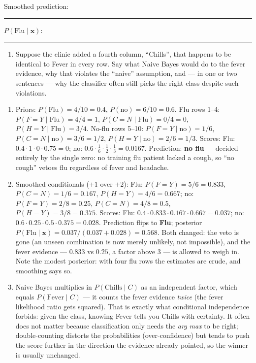 \documentclass[
  11pt,
]{article}
\providecommand{\tightlist}{%
  \setlength{\itemsep}{0pt}\setlength{\parskip}{0pt}}
\newcommand{\answerspace}[1]{\par\vspace*{#1}}  %
\newcommand{\blank}[1][1.2in]{\rule{#1}{0.4pt}}
\begin{document}
Smoothed prediction:
\blank[0.8in]\quad \(P(\text{Flu} \mid \mathbf{x})\): \blank[0.8in]

\answerspace{2.4in}

\begin{enumerate}
\def\labelenumi{(\alph{enumi})}
\setcounter{enumi}{2}
\tightlist
\item
  Suppose the clinic added a fourth column, ``Chills'', that happens to
  be identical to Fever in every row. Say what Naive Bayes would do to
  the fever evidence, why that violates the ``naive'' assumption, and
  --- in one or two sentences --- why the classifier often still picks
  the right class despite such violations.
\end{enumerate}

\answerspace{1.8in}

\begin{solutionbox}

\begin{enumerate}
\def\labelenumi{(\alph{enumi})}
\item
  Priors: \(P(\text{Flu}) = 4/10 = 0.4\), \(P(\text{no}) = 6/10 = 0.6\).
  Flu rows 1--4: \(P(F{=}Y \mid \text{Flu}) = 4/4 = 1\),
  \(P(C{=}N \mid \text{Flu}) = 0/4 = 0\),
  \(P(H{=}Y \mid \text{Flu}) = 3/4\). No-flu rows 5--10:
  \(P(F{=}Y \mid \text{no}) = 1/6\),
  \(P(C{=}N \mid \text{no}) = 3/6 = 1/2\),
  \(P(H{=}Y \mid \text{no}) = 2/6 = 1/3\). Scores: Flu:
  \(0.4 \cdot 1 \cdot 0 \cdot 0.75 = 0\); no:
  \(0.6 \cdot \tfrac16 \cdot \tfrac12 \cdot \tfrac13 = 0.0167\).
  Prediction: \textbf{no flu} --- decided entirely by the single zero:
  no training flu patient lacked a cough, so ``no cough'' vetoes flu
  regardless of fever and headache.
\item
  Smoothed conditionals (\(+1\) over \(+2\)): Flu:
  \(P(F{=}Y) = 5/6 = 0.833\), \(P(C{=}N) = 1/6 = 0.167\),
  \(P(H{=}Y) = 4/6 = 0.667\); no: \(P(F{=}Y) = 2/8 = 0.25\),
  \(P(C{=}N) = 4/8 = 0.5\), \(P(H{=}Y) = 3/8 = 0.375\). Scores: Flu:
  \(0.4 \cdot 0.833 \cdot 0.167 \cdot 0.667 = 0.037\); no:
  \(0.6 \cdot 0.25 \cdot 0.5 \cdot 0.375 = 0.028\). Prediction flips to
  \textbf{Flu}; posterior
  \(P(\text{Flu} \mid \mathbf{x}) = 0.037/(0.037+0.028) = 0.568\). Both
  changed: the veto is gone (an unseen combination is now merely
  unlikely, not impossible), and the fever evidence --- \(0.833\) vs
  \(0.25\), a factor above 3 --- is allowed to weigh in. Note the modest
  posterior: with four flu rows the estimates are crude, and smoothing
  says so.
\item
  Naive Bayes multiplies in \(P(\text{Chills} \mid C)\) as an
  independent factor, which equals \(P(\text{Fever} \mid C)\) --- it
  counts the fever evidence \emph{twice} (the fever likelihood ratio
  gets squared). That is exactly what conditional independence forbids:
  given the class, knowing Fever tells you Chills with certainty. It
  often does not matter because classification only needs the \emph{arg
  max} to be right; double-counting distorts the probabilities
  (over-confidence) but tends to push the score further in the direction
  the evidence already pointed, so the winner is usually unchanged.
\end{enumerate}

\end{solutionbox}
\end{document}
